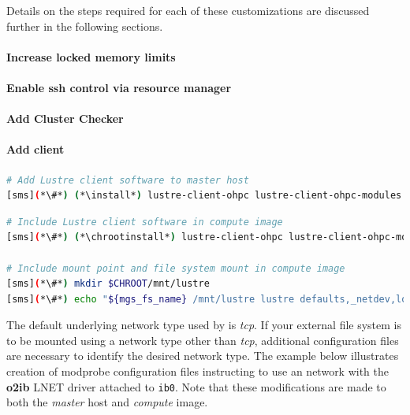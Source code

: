 \documentclass[letterpaper]{article}
\newcommand{\install}{yum -y install}
\newcommand{\chrootinstall}{yum -y --installroot=\$CHROOT install}
\begin{document}
\noindent Details on the steps required for each of these customizations are
discussed further in the following sections.

\paragraph{Increase locked memory limits}


\paragraph{Enable ssh control via resource manager} 


\paragraph{Add Cluster Checker} \label{sec:add_clck}


\paragraph{Add \Lustre{} client} \label{sec:lustre_client}



\begin{lstlisting}[language=bash,keywords={},upquote=true]
# Add Lustre client software to master host
[sms](*\#*) (*\install*) lustre-client-ohpc lustre-client-ohpc-modules
\end{lstlisting}

\begin{lstlisting}[language=bash,keywords={},upquote=true]
# Include Lustre client software in compute image
[sms](*\#*) (*\chrootinstall*) lustre-client-ohpc lustre-client-ohpc-modules

# Include mount point and file system mount in compute image
[sms](*\#*) mkdir $CHROOT/mnt/lustre
[sms](*\#*) echo "${mgs_fs_name} /mnt/lustre lustre defaults,_netdev,localflock 0 0" >> $CHROOT/etc/fstab
\end{lstlisting}

The default underlying network type used by \Lustre{} is {\em tcp}. If your
external \Lustre{} file system is to be mounted using a network type other than
{\em tcp}, additional configuration files are necessary to identify the desired
network type. The example below illustrates creation of modprobe configuration files
instructing \Lustre{} to use an \InfiniBand{} network with the \textbf{o2ib} LNET driver
attached to \texttt{ib0}. Note that these modifications are made to both the
{\em master} host and {\em compute} image.
\end{document}
